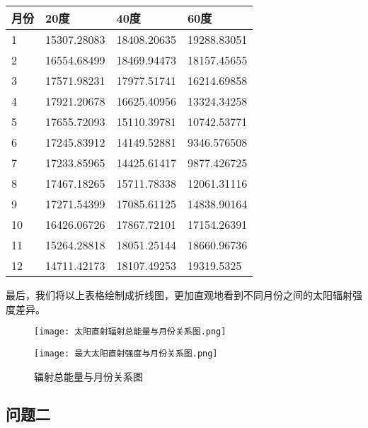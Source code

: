 \documentclass[withoutpreface,bwprint]{cumcmthesis} %
\begin{document}
\begin{table}[!ht]
	\centering
	\begin{tabular}{|l|l|l|l|}
		\hline
		月份 & 20度 & 40度 & 60度  \\ \hline
		1 & 15307.28083 & 18408.20635 & 19288.83051  \\ \hline
		2 & 16554.68499 & 18469.94473 & 18157.45655  \\ \hline
		3 & 17571.98231 & 17977.51741 & 16214.69858  \\ \hline
		4 & 17921.20678 & 16625.40956 & 13324.34258  \\ \hline
		5 & 17655.72093 & 15110.39781 & 10742.53771  \\ \hline
		6 & 17245.83912 & 14149.52881 & 9346.576508  \\ \hline
		7 & 17233.85965 & 14425.61417 & 9877.426725  \\ \hline
		8 & 17467.18265 & 15711.78338 & 12061.31116  \\ \hline
		9 & 17271.54399 & 17085.61125 & 14838.90164  \\ \hline
		10 & 16426.06726 & 17867.72101 & 17154.26391  \\ \hline
		11 & 15264.28818 & 18051.25144 & 18660.96736  \\ \hline
		12 & 14711.42173 & 18107.49253 & 19319.5325  \\ \hline
	\end{tabular}
\end{table}

最后，我们将以上表格绘制成折线图，更加直观地看到不同月份之间的太阳辐射强度差异。


\newpage
\begin{figure}
	\centering
	\begin{minipage}[c]{0.45\textwidth}
		\centering
		\texttt{[image: 太阳直射辐射总能量与月份关系图.png]}
	\end{minipage}
	\begin{minipage}[c]{0.45\textwidth}
		\centering
		\texttt{[image: 最大太阳直射强度与月份关系图.png]}
	\end{minipage}
	\caption{辐射总能量与月份关系图}
\end{figure}

\subsection{问题二}
\end{document}
